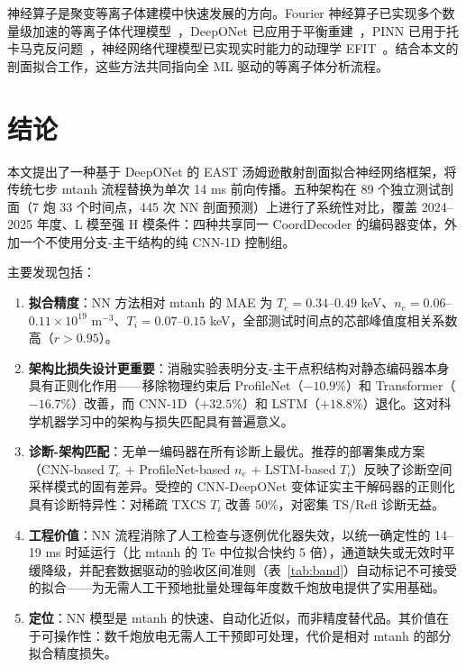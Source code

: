 \documentclass[a4paper,12pt]{ctexart}
\begin{document}
神经算子是聚变等离子体建模中快速发展的方向。Fourier 神经算子已实现多个数量级加速的等离子体代理模型~\cite{fno_plasma}，DeepONet 已应用于平衡重建~\cite{deeponet_equilibrium}，PINN 已用于托卡马克反问题~\cite{pinn_tokamak,pinn_east}，神经网络代理模型已实现实时能力的动理学 EFIT~\cite{nn_efit_surrogate}。结合本文的剖面拟合工作，这些方法共同指向全 ML 驱动的等离子体分析流程。

\section{结论}

本文提出了一种基于 DeepONet 的 EAST 汤姆逊散射剖面拟合神经网络框架，将传统七步 mtanh 流程替换为单次 14 ms 前向传播。五种架构在 89 个独立测试剖面（7 炮 33 个时间点，445 次 NN 剖面预测）上进行了系统性对比，覆盖 2024--2025 年度、L 模至强 H 模条件：四种共享同一 CoordDecoder 的编码器变体，外加一个不使用分支-主干结构的纯 CNN-1D 控制组。

主要发现包括：

\begin{enumerate}
    \item \textbf{拟合精度}：NN 方法相对 mtanh 的 MAE 为 $T_e = 0.34$--$0.49$ keV、$n_e = 0.06$--$0.11 \times 10^{19}$ m$^{-3}$、$T_i = 0.07$--$0.15$ keV，全部测试时间点的芯部峰值度相关系数高（$r > 0.95$）。

    \item \textbf{架构比损失设计更重要}：消融实验表明分支-主干点积结构对静态编码器本身具有正则化作用——移除物理约束后 ProfileNet（$-10.9\%$）和 Transformer（$-16.7\%$）改善，而 CNN-1D（$+32.5\%$）和 LSTM（$+18.8\%$）退化。这对科学机器学习中的架构与损失匹配具有普遍意义。

    \item \textbf{诊断-架构匹配}：无单一编码器在所有诊断上最优。推荐的部署集成方案（CNN-based $T_e$ + ProfileNet-based $n_e$ + LSTM-based $T_i$）反映了诊断空间采样模式的固有差异。受控的 CNN-DeepONet 变体证实主干解码器的正则化具有诊断特异性：对稀疏 TXCS $T_i$ 改善 50\%，对密集 TS/Refl 诊断无益。

    \item \textbf{工程价值}：NN 流程消除了人工检查与逐例优化器失效，以统一确定性的 14--19 ms 时延运行（比 mtanh 的 Te 中位拟合快约 5 倍），通道缺失或无效时平缓降级，并配套数据驱动的验收区间准则（表~\ref{tab:band}）自动标记不可接受的拟合——为无需人工干预地批量处理每年度数千炮放电提供了实用基础。

    \item \textbf{定位}：NN 模型是 mtanh 的快速、自动化近似，而非精度替代品。其价值在于可操作性：数千炮放电无需人工干预即可处理，代价是相对 mtanh 的部分拟合精度损失。
\end{enumerate}
\end{document}
